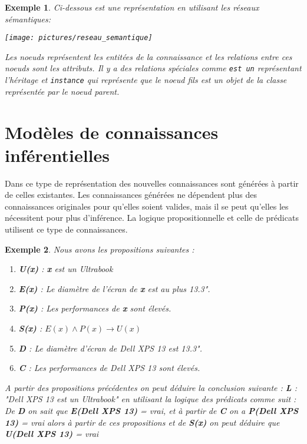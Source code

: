 \documentclass[12pt,a4paper]{report}
\newtheorem{example}{Exemple}
\begin{document}
\begin{example}
Ci-dessous est une représentation en utilisant les réseaux sémantiques:

\texttt{[image: pictures/reseau\_semantique]}

Les noeuds représentent les entitées de la connaissance et les relations entre ces noeuds sont les attributs.
Il y a des relations spéciales comme \texttt{est un} représentant l'héritage et \texttt{instance} qui
représente que le noeud fils est un objet de la classe représentée par le noeud parent.
\end{example}

\section{Modèles de connaissances inférentielles}
Dans ce type de représentation des nouvelles connaissances sont générées à partir de celles existantes.
Les connaissances générées ne dépendent plus des connaissances originales pour qu'elles soient valides, mais
il se peut qu'elles les nécessitent pour plus d'inférence.\cite{KRC} La logique propositionnelle et celle de
prédicats utilisent ce type de connaissances.

\begin{example}
Nous avons les propositions suivantes :
\begin{enumerate}
\item \textbf{U(x)} : \textbf{x} est un Ultrabook
\item \textbf{E(x)} : Le diamètre de l'écran de \textbf{x} est au plus 13.3".
\item \textbf{P(x)} : Les performances de \textbf{x} sont élevés.
\item \textbf{S(x)} : $ E(x) \wedge P(x) \rightarrow U(x) $
\item \textbf{D} : Le diamètre d'écran de Dell XPS 13 est 13.3".
\item \textbf{C} : Les performances de Dell XPS 13 sont élevés.
\end{enumerate}
A partir des propositions précédentes on peut déduire la conclusion suivante :
\textbf{L} : "Dell XPS 13 est un Ultrabook"  en utilisant la logique des prédicats comme suit :
De \textbf{D} on sait que \textbf{E(Dell XPS 13)} = vrai, et à partir de \textbf{C} on a \textbf{P(Dell XPS 13)} = vrai
alors à partir de ces propositions et de \textbf{S(x)} on peut déduire que \textbf{U(Dell XPS 13)} = vrai
\end{example}
\end{document}
